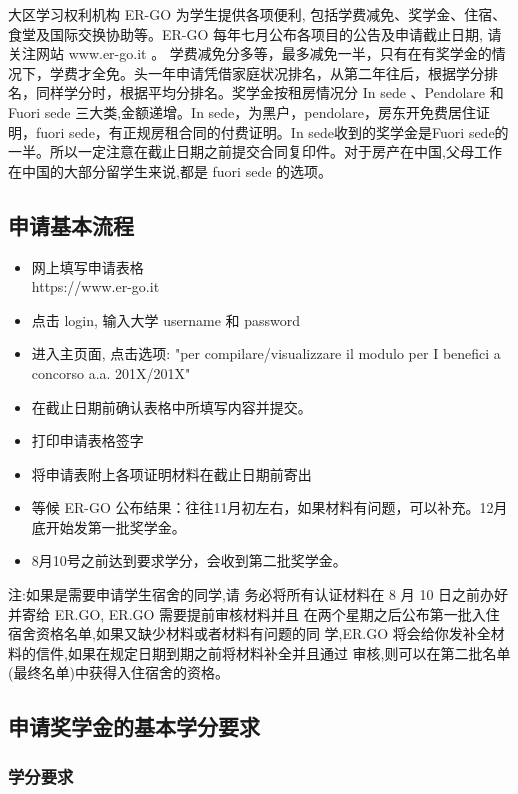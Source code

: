 \documentclass[3pt,a5paper,openright,twoside]{book}
\begin{document}
大区学习权利机构 ER-GO 为学生提供各项便利, 包括学费减免、奖学金、住宿、食堂及国际交换协助等。ER-GO 每年七月公布各项目的公告及申请截止日期, 请关注网站 www.er-go.it 。 
学费减免分多等，最多减免一半，只有在有奖学金的情况下，学费才全免。头一年申请凭借家庭状况排名，从第二年往后，根据学分排名，同样学分时，根据平均分排名。奖学金按租房情况分 In sede 、Pendolare 和 Fuori sede 三大类,金额递增。In sede，为黑户，pendolare，房东开免费居住证明，fuori sede，有正规房租合同的付费证明。In sede收到的奖学金是Fuori sede的一半。所以一定注意在截止日期之前提交合同复印件。对于房产在中国,父母工作在中国的大部分留学生来说,都是 fuori sede 的选项。

\subsection{申请基本流程}
\begin{itemize}
 \item 网上填写申请表格 \\https://www.er-go.it
 \item 点击 login, 输入大学 username 和 password
 \item 进入主页面, 点击选项: "per compilare/visualizzare il modulo per I benefici a concorso a.a.
201X/201X"
 \item 在截止日期前确认表格中所填写内容并提交。
 \item 打印申请表格签字 
 \item 将申请表附上各项证明材料在截止日期前寄出 
 \item 等候 ER-GO 公布结果：往往11月初左右，如果材料有问题，可以补充。12月底开始发第一批奖学金。
 \item 8月10号之前达到要求学分，会收到第二批奖学金。
\end{itemize}
注:如果是需要申请学生宿舍的同学,请
务必将所有认证材料在 8 月 10 日之前办好并寄给 ER.GO, ER.GO 需要提前审核材料并且 在两个星期之后公布第一批入住宿舍资格名单,如果又缺少材料或者材料有问题的同 学,ER.GO 将会给你发补全材料的信件,如果在规定日期到期之前将材料补全并且通过 审核,则可以在第二批名单(最终名单)中获得入住宿舍的资格。

\subsection{申请奖学金的基本学分要求}

\subsubsection{学分要求}
\end{document}
